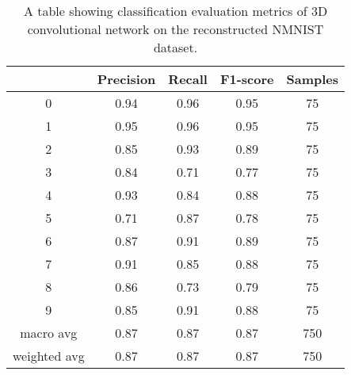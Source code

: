 \begin{table}[htb]
    \centering
    \begin{tabular}{|| c | c | c | c | c ||}
        \hline
             & Precision & Recall & F1-score & Samples \\
        \hline \hline
        0            & 0.94 & 0.96 & 0.95 & 75  \\
        \hline
        1            & 0.95 & 0.96 & 0.95 & 75  \\
        \hline
        2            & 0.85 & 0.93 & 0.89 & 75  \\
        \hline
        3            & 0.84 & 0.71 & 0.77 & 75  \\
        \hline
        4            & 0.93 & 0.84 & 0.88 & 75  \\
        \hline
        5            & 0.71 & 0.87 & 0.78 & 75  \\
        \hline
        6            & 0.87 & 0.91 & 0.89 & 75  \\
        \hline
        7            & 0.91 & 0.85 & 0.88 & 75  \\
        \hline
        8            & 0.86 & 0.73 & 0.79 & 75  \\
        \hline
        9            & 0.85 & 0.91 & 0.88 & 75  \\
        \hline
        macro avg    & 0.87 & 0.87 & 0.87 & 750 \\
        \hline
        weighted avg & 0.87 & 0.87 & 0.87 & 750 \\
        \hline
    \end{tabular}
    \caption{A table showing classification evaluation metrics of 3D convolutional network on the reconstructed NMNIST dataset.}
    \label{tab:conv3d_nmnist_recon_evaluation_metrics}
\end{table}


